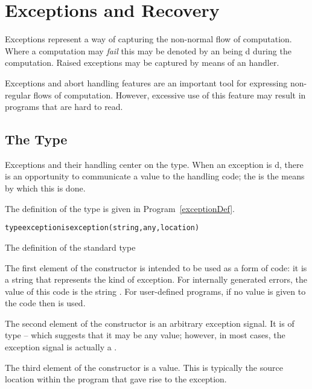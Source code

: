 \section{Exceptions and Recovery}
\label{exceptions}
Exceptions represent a way of capturing the non-normal flow of computation. Where a computation may \emph{fail} this may be denoted by an  being d during the computation. Raised exceptions may be captured by means of an  handler.
\begin{aside}
Exceptions and abort handling features are an important tool for expressing non-regular flows of computation. However, excessive use of this feature may result in programs that are hard to read.
\end{aside}

\subsection{The  Type}
\label{exceptionType}
Exceptions and their handling center on the  type. When an exception is d, there is an opportunity to communicate a value to the handling code; the  is the means by which this is done.

The definition of the  type is given in Program~\vref{exceptionDef}.
\begin{program}
\begin{alltt}
type exception is exception(string,any,location)
\end{alltt}
\caption{The definition of the standard  type\label{exceptionDef}}
\end{program}

The first element of the  constructor is intended to be used as a form of code: it is a string that represents the kind of exception. For internally generated errors, the value of this code is the string . For user-defined programs, if no value is given to the code then  is used.

The second element of the  constructor is an arbitrary exception signal. It is of type  -- which suggests that it may be any value; however, in most cases, the exception signal is actually a .

The third element of the  constructor is a  value. This is typically the source location within the program that gave rise to the exception.

